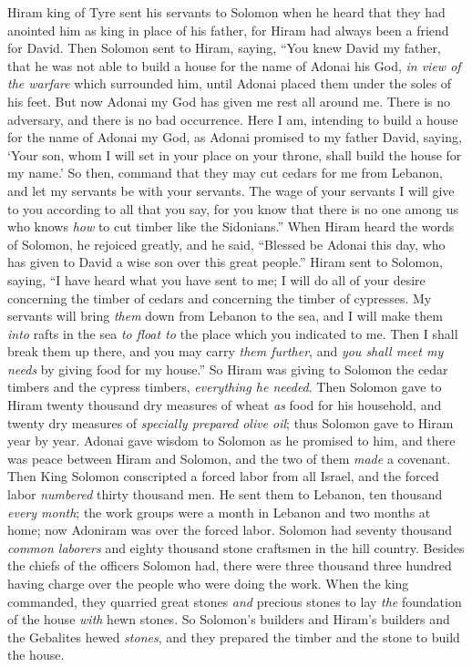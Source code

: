 \begin{biblechapter} %
 Hiram king of Tyre sent his servants to Solomon when he heard that they had anointed him as king in place of his father, for Hiram had always been a friend for David.
\verse Then Solomon sent to Hiram, saying,
\verse “You knew David my father, that he was not able to build a house for the name of Adonai his God, \textit{in view of the warfare} which surrounded him, until Adonai placed them under the soles of his feet.
\verse But now Adonai my God has given me rest all around me. There is no adversary, and there is no bad occurrence.
\verse Here I am, intending to build a house for the name of Adonai my God, as Adonai promised to my father David, saying, ‘Your son, whom I will set in your place on your throne, shall build the house for my name.’
\verse So then, command that they may cut cedars for me from Lebanon, and let my servants be with your servants. The wage of your servants I will give to you according to all that you say, for you know that there is no one among us who knows \textit{how} to cut timber like the Sidonians.”
\verse When Hiram heard the words of Solomon, he rejoiced greatly, and he said, “Blessed be Adonai this day, who has given to David a wise son over this great people.”
\verse Hiram sent to Solomon, saying, “I have heard what you have sent to me; I will do all of your desire concerning the timber of cedars and concerning the timber of cypresses.
\verse My servants will bring \textit{them} down from Lebanon to the sea, and I will make them \textit{into} rafts in the sea \textit{to float to} the place which you indicated to me. Then I shall break them up there, and you may carry \textit{them further}, and \textit{you shall meet my needs} by giving food for my house.”
\verse So Hiram was giving to Solomon the cedar timbers and the cypress timbers, \textit{everything he needed}.
\verse Then Solomon gave to Hiram twenty thousand dry measures of wheat \textit{as} food for his household, and twenty dry measures of \textit{specially prepared olive oil}; thus Solomon gave to Hiram year by year.
\verse Adonai gave wisdom to Solomon as he promised to him, and there was peace between Hiram and Solomon, and the two of them \textit{made} a covenant.
\verse Then King Solomon conscripted a forced labor from all Israel, and the forced labor \textit{numbered} thirty thousand men.
\verse He sent them to Lebanon, ten thousand \textit{every month}; the work groups were a month in Lebanon and two months at home; now Adoniram was over the forced labor.
\verse Solomon had seventy thousand \textit{common laborers} and eighty thousand stone craftsmen in the hill country.
\verse Besides the chiefs of the officers Solomon had, there were three thousand three hundred having charge over the people who were doing the work.
\verse When the king commanded, they quarried great stones \textit{and} precious stones to lay \textit{the} foundation of the house \textit{with} hewn stones.
\verse So Solomon’s builders and Hiram’s builders and the Gebalites hewed \textit{stones}, and they prepared the timber and the stone to build the house.
\end{biblechapter}

